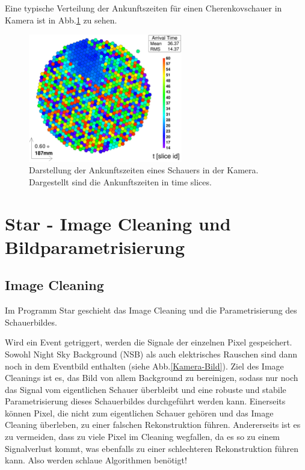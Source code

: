 Eine typische Verteilung der Ankunftszeiten für einen Cherenkovschauer in Kamera ist in Abb.\ref{Kamera-Bild-ArrivalTimes} zu sehen.

\begin{figure}
    \centering
    \includegraphics[width=0.6\textwidth]{./Plots/Signal_ArrivalTime_fertig.png}
    \caption{Darstellung der Ankunftszeiten eines Schauers in der Kamera. Dargestellt sind die Ankunftszeiten in time slices.}
    \label{Kamera-Bild-ArrivalTimes}
\end{figure}

\section{Star - Image Cleaning und Bildparametrisierung}

\subsection{Image Cleaning}
Im Programm Star geschieht das Image Cleaning und die Parametrisierung des Schauerbildes.

Wird ein Event getriggert, werden die Signale der einzelnen Pixel gespeichert.
Sowohl Night Sky Background (NSB) als auch elektrisches Rauschen sind dann noch in dem Eventbild enthalten (siehe Abb.\ref{Kamera-Bild}).
Ziel des Image Cleanings ist es, das Bild von allem Background zu bereinigen, sodass nur noch das Signal vom eigentlichen Schauer überbleibt und eine robuste und stabile Parametrisierung dieses Schauerbildes durchgeführt werden kann.
Einerseits können Pixel, die nicht zum eigentlichen Schauer gehören und das Image Cleaning überleben, zu einer falschen Rekonstruktion führen.
Andererseits ist es zu vermeiden, dass zu viele Pixel im Cleaning wegfallen, da es so zu einem Signalverlust kommt, was ebenfalls zu einer schlechteren Rekonstruktion führen kann.
Also werden schlaue Algorithmen benötigt! 

